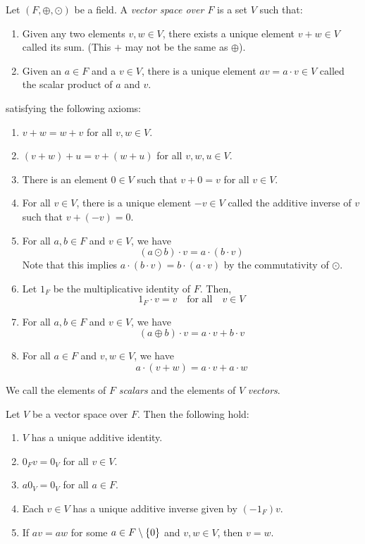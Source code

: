\documentclass[12pt]{article}
\begin{document}
\begin{defn}[] \label{defn:}
    Let $(F, \oplus, \odot)$ be a field. A \emph{vector space over $F$} is a set $V$ such that:
    \begin{enumerate}[label=(\alph*)]
        \item Given any two elements $v, w \in V$, there exists a unique element $v + w \in V$ called its sum.
        (This $+$ may not be the same as $\oplus$).
        \item Given an $a \in F$ and a $v \in V$, there is a unique element $av = a \cdot v \in V$ called the scalar product of $a$ and $v$.
    \end{enumerate}
    satisfying the following axioms:
    \begin{enumerate}[label=(V\arabic*)]
        \item $v + w = w + v$ for all $v, w \in V$.
        \item $(v + w) + u = v + (w + u)$ for all $v, w, u \in V$.
        \item There is an element $0 \in V$ such that $v + 0 = v$ for all $v \in V$.
        \item For all $v \in V$, there is a unique element $-v \in V$ called the additive inverse of $v$ such that $v + (-v) = 0$.
        \item For all $a, b \in F$ and $v \in V$, we have \[
            (a \odot b) \cdot v = a \cdot (b \cdot v)
        \] Note that this implies $a \cdot (b \cdot v) = b \cdot (a \cdot v)$ by the commutativity of $\odot$.
        \item Let $1_{F}$ be the multiplicative identity of $F$. Then, \[
            1_{F} \cdot v = v \quad\text{for all}\quad v \in V
        \]
        \item For all $a, b \in F$ and $v \in V$, we have \[
            (a \oplus b) \cdot v = a \cdot v + b \cdot v
        \]
        \item For all $a \in F$ and $v, w \in V$, we have \[
            a \cdot (v + w) = a \cdot v + a \cdot w
        \]
    \end{enumerate}
    We call the elements of $F$ \emph{scalars} and the elements of $V$ \emph{vectors}.
\end{defn}

\begin{prop} \label{prop:vector:properties}
    Let $V$ be a vector space over $F$. Then the following hold:
    \begin{enumerate}[label=(\alph*)]
        \item $V$ has a unique additive identity.
        \item $0_{F} v = 0_{V}$ for all $v \in V$.
        \item $a 0_{V} = 0_{V}$ for all $a \in F$.
        \item Each $v \in V$ has a unique additive inverse given by $(-1_{F}) v$.
        \item If $a v = a w$ for some $a \in F \setminus\set{0}$ and $v, w \in V$, then $v = w$.
    \end{enumerate}
\end{prop}
\end{document}
